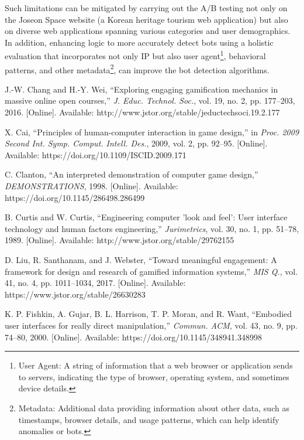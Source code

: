 \documentclass[conference]{IEEEtran}
\begin{document}
Such limitations can be mitigated by carrying out the A/B testing not only on the Joseon Space website (a Korean heritage tourism web application) but also on diverse web applications spanning various categories and user demographics. In addition, enhancing logic to more accurately detect bots using a holistic evaluation that incorporates not only IP but also user agent\footnote{User Agent: A string of information that a web browser or application sends to servers, indicating the type of browser, operating system, and sometimes device details.}, behavioral patterns, and other metadata\footnote{Metadata: Additional data providing information about other data, such as timestamps, browser details, and usage patterns, which can help identify anomalies or bots.}, can improve the bot detection algorithms.
\begin{thebibliography}{00}

 J.-W. Chang and H.-Y. Wei, ``Exploring engaging gamification mechanics in massive online open courses,'' \textit{J. Educ. Technol. Soc.}, vol. 19, no. 2, pp. 177–203, 2016. [Online]. Available: http://www.jstor.org/stable/jeductechsoci.19.2.177

 X. Cai, ``Principles of human-computer interaction in game design,'' in \textit{Proc. 2009 Second Int. Symp. Comput. Intell. Des.}, 2009, vol. 2, pp. 92–95. [Online]. Available: https://doi.org/10.1109/ISCID.2009.171

 C. Clanton, ``An interpreted demonstration of computer game design,'' \textit{DEMONSTRATIONS}, 1998. [Online]. Available: https://doi.org/10.1145/286498.286499

 B. Curtis and W. Curtis, ``Engineering computer 'look and feel': User interface technology and human factors engineering,'' \textit{Jurimetrics}, vol. 30, no. 1, pp. 51–78, 1989. [Online]. Available: http://www.jstor.org/stable/29762155

 D. Liu, R. Santhanam, and J. Webster, ``Toward meaningful engagement: A framework for design and research of gamified information systems,'' \textit{MIS Q.}, vol. 41, no. 4, pp. 1011–1034, 2017. [Online]. Available: https://www.jstor.org/stable/26630283

 K. P. Fishkin, A. Gujar, B. L. Harrison, T. P. Moran, and R. Want, ``Embodied user interfaces for really direct manipulation,'' \textit{Commun. ACM}, vol. 43, no. 9, pp. 74–80, 2000. [Online]. Available: https://doi.org/10.1145/348941.348998


\end{thebibliography}
\end{document}
